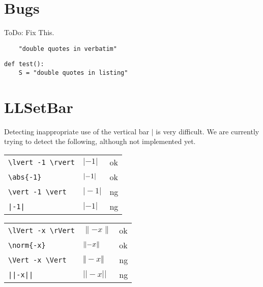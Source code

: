 \documentclass[a4paper]{article}
\newcommand{\tA}[1]{\textcolor{cA}{#1}}
\newcommand{\tD}[1]{\textcolor{cD}{#1}}
\begin{document}



\newpage
\appendix

\renewcommand\thesection{Appendix \Alph{section}}

\section{Bugs}

ToDo: Fix This.

\begin{verbatim}
	"double quotes in verbatim"
\end{verbatim}

\begin{lstlisting}
def test():
	S = "double quotes in listing"
\end{lstlisting}

\section{LLSetBar}

Detecting inappropriate use of the vertical bar $|$ is very difficult.
We are currently trying to detect the following, although not implemented yet.

\begin{table}[H]
	\centering
	\begin{tabular}{lll}
		\verb#\lvert -1 \rvert# & $\lvert -1 \rvert$ & \tA{ok} \\
		\verb#\abs{-1}#         & $\abs{-1}$         & \tA{ok} \\
		\verb#\vert -1 \vert#   & $\vert -1 \vert$   & \tD{ng} \\
		\verb#|-1|#             & $|-1|$             & \tD{ng} \\
	\end{tabular}
\end{table}


\begin{table}[H]
	\centering
	\begin{tabular}{lll}
		\verb#\lVert -x \rVert# & $\lVert -x \rVert$ & \tA{ok} \\
		\verb#\norm{-x}#        & $\norm{-x}$        & \tA{ok} \\
		\verb#\Vert -x \Vert#   & $\Vert -x \Vert$   & \tD{ng} \\
		\verb#||-x||#           & $||-x||$           & \tD{ng} \\
	\end{tabular}
\end{table}
\end{document}
